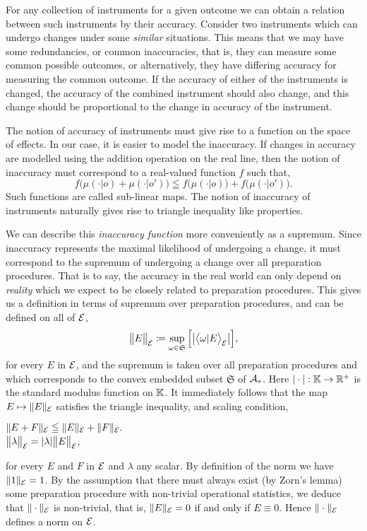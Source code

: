 \documentclass[11pt]{article}
\begin{document}
For any collection of instruments for a given outcome we can obtain a relation between such instruments by their accuracy. Consider two instruments which can undergo changes under some \emph{similar} situations. This means that we may have some redundancies, or common inaccuracies, that is, they can measure some common possible outcomes, or alternatively, they have differing accuracy for measuring the common outcome. If the accuracy of either of the instruments is changed, the accuracy of the combined instrument should also change, and this change should be proportional to the change in accuracy of the instrument.

The notion of accuracy of instruments must give rise to a function on the space of effects. In our case, it is easier to model the inaccuracy. If changes in accuracy are modelled using the addition operation on the real line, then the notion of inaccuracy must correspond to a real-valued function $f$ such that,
$$f\big(\mu(\cdot|o)+ \mu(\cdot|o')\big)\leqq f\big(\mu(\cdot|o)\big) +f\big(\mu(\cdot|o')\big).$$
Such functions are called sub-linear maps. The notion of inaccuracy of instruments naturally gives rise to triangle inequality like properties.

We can describe this \emph{inaccuracy function} more conveniently as a supremum. Since inaccuracy represents the maximal likelihood of undergoing a change, it must correspond to the supremum of undergoing a change over all preparation procedures. That is to say, the accuracy in the real world can only depend on \emph{reality} which we expect to be closely related to preparation procedures. This gives us a definition in terms of supremum over preparation procedures, and can be defined on all of $\mathcal{E}$,
$$\big\| E\big\|_{\mathcal{E}}\coloneqq \sup_{\omega\in\mathfrak{S}}\Big[\big| \big\langle \omega|E\big\rangle_{\mathcal{E}}\big|\Big],$$
for every $E$ in $\mathcal{E}$, and the supremum is taken over all preparation procedures and which corresponds to the convex embedded subset $\mathfrak{S}$ of $\mathcal{A}_* $.  Here $|\cdot|:\mathbb{K}\to \mathbb{R}^+$ is the standard modulus function on $\mathbb{K}$. It immediately follows that the map $E\mapsto \|E\|_{\mathcal{E}}$ satisfies the triangle inequality, and scaling condition,
\begin{center}
	$\|E +F\|_{\mathcal{E}} \leqq \|E\|_{\mathcal{E}}+\|F\|_{\mathcal{E}}.$\\\vspace{.35em}
	$\big\|\lambda \big\|_{\mathcal{E}}=|\lambda| \big\|E\big\|_{\mathcal{E}}$,
\end{center}
for every $E$ and $F$ in $\mathcal{E}$ and $\lambda$ any scalar. By definition of the norm we have $\|1\|_{\mathcal{E}}=1$. By the assumption that there must always exist (by Zorn's lemma) some preparation procedure with non-trivial operational statistics, we deduce that $\|\cdot\|_{\mathcal{E}}$ is non-trivial, that is, $\|E\|_{\mathcal{E}}=0$ if and only if $E\equiv 0$. Hence
\(\|\cdot\|_{\mathcal{E}}\) defines a norm on $\mathcal{E}$.
\end{document}
